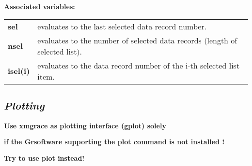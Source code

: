 \documentclass[]{article}
\begin{document}
\textbf{Associated variables: }

\begin{longtable}[]{@{}ll@{}}
\toprule
\endhead
\textbf{sel} & evaluates to the last selected data record
number.\tabularnewline
\textbf{nsel} & evaluates to the number of selected data records (length
of selected list).\tabularnewline
\textbf{isel(i)} & evaluates to the data record number of the i-th
selected list item.\tabularnewline
\bottomrule
\end{longtable}

\hypertarget{plotting}{%
\subsection{\texorpdfstring{\emph{Plotting}}{Plotting}}\label{plotting}}

\textbf{Use xmgrace as plotting interface (gplot) solely}

\textbf{if the Grsoftware supporting the plot command is not installed !
}

\textbf{Try to use plot instead!}
\end{document}
